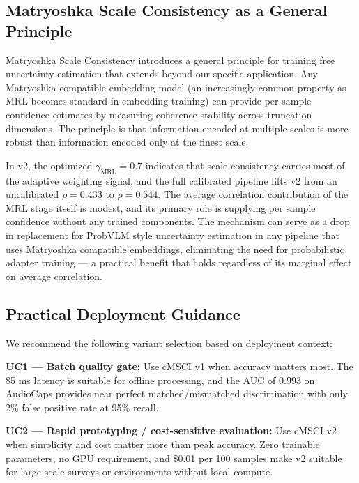 \subsection{Matryoshka Scale Consistency as a General Principle}\label{sec:matryoshka-discussion}

Matryoshka Scale Consistency introduces a general principle for training free uncertainty estimation that extends beyond our specific application. Any Matryoshka-compatible embedding model (an increasingly common property as MRL becomes standard in embedding training) can provide per sample confidence estimates by measuring coherence stability across truncation dimensions. The principle is that information encoded at multiple scales is more robust than information encoded only at the finest scale.

In v2, the optimized $\gamma_{\mathrm{MRL}} = 0.7$ indicates that scale consistency carries most of the adaptive weighting signal, and the full calibrated pipeline lifts v2 from an uncalibrated $\rho = 0.433$ to $\rho = 0.544$. The average correlation contribution of the MRL stage itself is modest, and its primary role is supplying per sample confidence without any trained components. The mechanism can serve as a drop in replacement for ProbVLM style uncertainty estimation in any pipeline that uses Matryoshka compatible embeddings, eliminating the need for probabilistic adapter training — a practical benefit that holds regardless of its marginal effect on average correlation.

\subsection{Practical Deployment Guidance}\label{sec:deployment-guidance}

We recommend the following variant selection based on deployment context:

\textbf{UC1 --- Batch quality gate:} Use cMSCI v1 when accuracy matters most. The 85 ms latency is suitable for offline processing, and the AUC of 0.993 on AudioCaps provides near perfect matched/mismatched discrimination with only 2\% false positive rate at 95\% recall.

\textbf{UC2 --- Rapid prototyping / cost-sensitive evaluation:} Use cMSCI v2 when simplicity and cost matter more than peak accuracy. Zero trainable parameters, no GPU requirement, and \$0.01 per 100 samples make v2 suitable for large scale surveys or environments without local compute.

